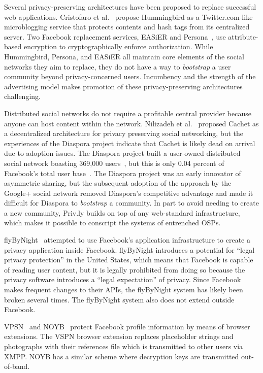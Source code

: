 \documentclass[letterpaper,twocolumn,10pt]{article}
\begin{document}
Several privacy-preserving architectures have been proposed to replace successful 
web applications. Cristofaro et al.~\cite{Cristofaro2012} propose Hummingbird as a 
Twitter.com-like microblogging service that protects contents and hash tags from 
its centralized server. Two Facebook replacement services, EASiER 
\cite{Jahid2011} and Persona~\cite{Starin2009},
use attribute-based encryption to cryptographically enforce authorization.
While Hummingbird, Persona, and EASiER all maintain core elements of the social networks they 
aim to replace, they do not have a way to \emph{bootstrap} a user 
community beyond privacy-concerned users. Incumbency and the strength of the 
advertising model makes promotion of these privacy-preserving architectures challenging.

Distributed social networks do not require a profitable central provider because anyone can host content 
within the network. Nilizadeh et al.~\cite{Nilizadeh2012} proposed Cachet as a 
decentralized architecture for privacy preserving social networking, but the 
experiences of the Diaspora project indicate that Cachet is likely dead on arrival 
due to adoption issues. The Diaspora project built a user-owned distributed 
social network boasting 369,000 users~\cite{Diasp.eu2013}, but this is only 
0.04 percent of Facebook's total user base~\cite{Facebook2013}. The Diaspora 
project was an early innovator of asymmetric sharing, but the subsequent adoption 
of the approach by the Google+ social network removed Diaspora's competitive 
advantage and made it difficult for Diaspora to \emph{bootstrap} a community. 
In part to avoid needing to create a new community, Priv.ly builds on 
top of any web-standard infrastructure, which makes it possible to conscript the 
systems of entrenched OSPs.

flyByNight~\cite{Lucas2008} attempted to use Facebook's application infrastructure to create a
privacy application inside Facebook. flyByNight introduces a 
potential for ``legal privacy protection'' in the United States, which means that Facebook is capable of reading
user content, but it is legally prohibited from doing so because the privacy software introduces 
a ``legal expectation'' of privacy. Since Facebook makes frequent changes to their APIs,
the flyByNight system has likely been broken several times.
The flyByNight system also does not extend outside Facebook.

VPSN~\cite{Conti2011} and NOYB~\cite{Guha2008} protect Facebook profile information by means of browser extensions.
The VSPN browser extension replaces placeholder strings and photographs with their references file which is transmitted to other users via XMPP.
NOYB has a similar scheme where decryption keys are transmitted out-of-band.
\end{document}
